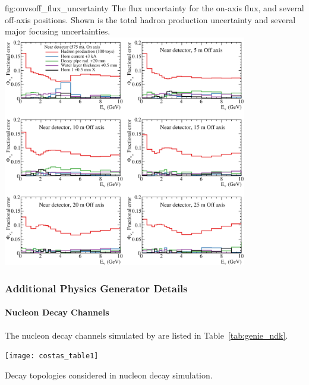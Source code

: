 \begin{dunefigure}{fig:onvsoff_flux_uncertainty}
{The flux uncertainty for the on-axis flux, and several off-axis positions. Shown is the total hadron production uncertainty and several major focusing uncertainties.}
    \includegraphics[width=0.8\textwidth]{graphics/onaxis_vs_offaxis_uncertainties.png}
\end{dunefigure}

\subsubsection{Additional Physics Generator Details}
\label{sec:tools-app-generator}

\paragraph{Nucleon Decay Channels}

The nucleon decay channels simulated by  are listed in Table~\ref{tab:genie_ndk}.

\begin{table}
  \texttt{[image: costas\_table1]}
  
  \caption[ nucleon decay topologies]{Decay topologies considered in  nucleon decay simulation.}
  \label{tab:genie_ndk}
\end{table}

%  



